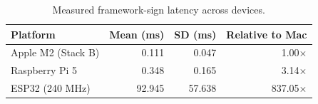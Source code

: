 \begin{table}[t]
\centering
\caption{Measured framework-sign latency across devices.}
\label{tab:cross-device-sign}
\begin{tabular}{lrrr}
\hline
\textbf{Platform} &
\textbf{Mean (ms)} &
\textbf{SD (ms)} &
\textbf{Relative to Mac} \\
\hline
Apple M2 (Stack B) &
0.111 &
0.047 &
1.00$\times$ \\

Raspberry Pi 5 &
0.348 &
0.165 &
3.14$\times$ \\

ESP32 (240 MHz) &
92.945 &
57.638 &
837.05$\times$ \\
\hline
\end{tabular}
\end{table}
